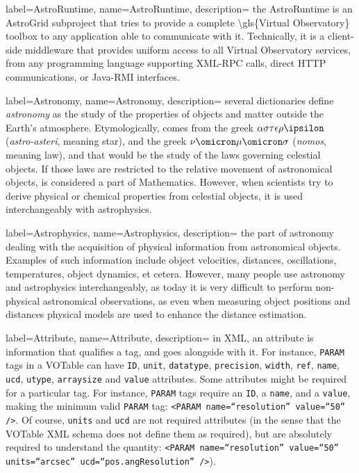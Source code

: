 {
    label={AstroRuntime},
    name={AstroRuntime},
    description={
    	the AstroRuntime is an \gls{AstroGrid} subproject that tries
        to provide a complete \gls{\gls{Virtual Observatory}} toolbox to
        any application able to communicate with it. Technically, it is
        a client-side middleware that provides uniform access to all
        \gls{Virtual Observatory} services, from any programming language
        supporting \gls{XML-RPC} calls, direct \gls{HTTP}
        communications, or \gls{Java-RMI} interfaces.
    }
}

{
    label={Astronomy},
    name={Astronomy},
    description={
    	several dictionaries define \emph{astronomy} as the study of
        the properties of objects and matter outside the Earth's
        atmosphere. Etymologically, comes from the greek
        $\alpha\sigma\tau\epsilon\rho\ipsilon$ (\emph{astro-asteri},
        meaning star), and the greek $\nu\omicron\mu\omicron\sigma$
        (\emph{nomos}, meaning law), and that would be the study of the
        laws governing celestial objects. If those laws are restricted
        to the relative movement of astronomical objects, is considered
        a part of Mathematics. However, when scientists try to derive
        physical or chemical properties from celestial objects, it is
        used interchangeably with \gls{astrophysics}.
    }
}

{
    label={Astrophysics},
    name={Astrophysics},
    description={
    	the part of \gls{astronomy} dealing with the acquisition of
        physical information from astronomical objects. Examples of
        such information include object velocities, distances,
        oscillations, temperatures, object dynamics, et cetera.
		However, many
        people use astronomy and astrophysics interchangeably, as today
        it is very difficult to perform non-physical astronomical
        observations, as even when measuring object positions and
        distances physical models are used to enhance the distance
        estimation.
    }
}

{
    label={Attribute},
    name={Attribute},
    description={
    	in \gls{XML}, an attribute is information that qualifies a tag,
        and goes alongside with it. For instance, \texttt{PARAM}
        \gls{tags} in a \gls{VOTable} can have \texttt{ID},
        \texttt{unit}, \texttt{datatype}, \texttt{precision},
        \texttt{width}, \texttt{ref}, \texttt{name}, \texttt{ucd},
        \texttt{utype}, \texttt{arraysize} and \texttt{value}
        attributes. Some attributes might be required for a particular
        tag. For instance, \texttt{PARAM} tags require an \texttt{ID},
        a \texttt{name}, and a \texttt{value}, making the minimum valid
        \texttt{PARAM} tag: \texttt{<PARAM name=``resolution''
        value=``50'' />}. Of course, \texttt{units} and \texttt{ucd}
        are not required attributes (in the sense that the VOTable XML
        schema does not define them as required), but are absolutely
        required to understand the quantity: \texttt{<PARAM
        name=``resolution'' value=``50'' units=``arcsec''
        ucd=``pos.angResolution'' />}).
    }
}


